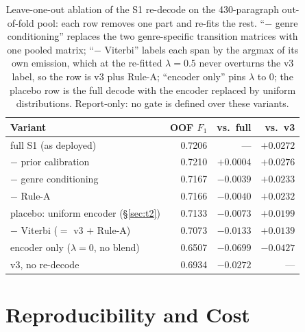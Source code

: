 \documentclass[11pt]{article}
\begin{document}
\begin{table}[h]
\centering\scriptsize
\setlength{\tabcolsep}{4pt}
\begin{tabular}{lrrr}
\toprule
Variant & OOF $F_1$ & vs.\ full & vs.\ v3 \\
\midrule
full S1 (as deployed) & 0.7206 & --- & $+0.0272$ \\
$-$ prior calibration & 0.7210 & $+0.0004$ & $+0.0276$ \\
$-$ genre conditioning & 0.7167 & $-0.0039$ & $+0.0233$ \\
$-$ Rule-A & 0.7166 & $-0.0040$ & $+0.0232$ \\
placebo: uniform encoder (\S\ref{sec:t2}) & 0.7133 & $-0.0073$ & $+0.0199$ \\
$-$ Viterbi ($=$ v3 $+$ Rule-A) & 0.7073 & $-0.0133$ & $+0.0139$ \\
encoder only ($\lambda{=}0$, no blend) & 0.6507 & $-0.0699$ & $-0.0427$ \\
\midrule
v3, no re-decode & 0.6934 & $-0.0272$ & --- \\
\bottomrule
\end{tabular}
\caption{Leave-one-out ablation of the S1 re-decode on the 430-paragraph
out-of-fold pool: each row removes one part and re-fits the rest.
``$-$ genre conditioning'' replaces the two genre-specific transition
matrices with one pooled matrix; ``$-$ Viterbi'' labels each span by the
argmax of its own emission, which at the re-fitted $\lambda{=}0.5$
never overturns the v3 label, so the row is v3 plus Rule-A; ``encoder
only'' pins $\lambda$ to 0; the placebo row is the full decode with the
encoder replaced by uniform distributions. Report-only: no gate is
defined over these variants.}
\label{tab:s1ablation}
\end{table}

\section{Reproducibility and Cost}
\label{app:repro}
\end{document}
